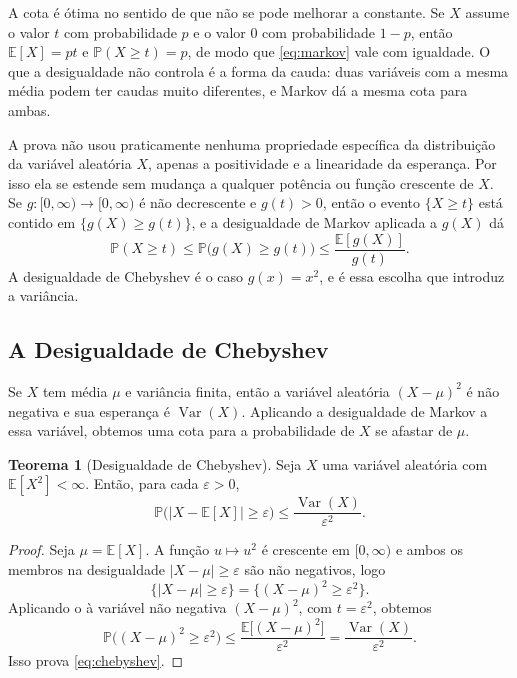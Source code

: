 \documentclass[12pt,portuguese]{article}
\theoremstyle{definition}
\newtheorem{theorem}{Teorema}
\theoremstyle{plainexercise}
\theoremstyle{starredexercise}
\theoremstyle{definition}
\begin{document}
A cota é ótima no sentido de que não se pode melhorar a constante. Se $X$
assume o valor $t$ com probabilidade $p$ e o valor $0$ com probabilidade
$1-p$, então $\mathbb{E}[X]=pt$ e $\mathbb{P}(X\geqslant t)=p$, de modo que
\eqref{eq:markov} vale com igualdade. O que a desigualdade não controla é a
forma da cauda: duas variáveis com a mesma média podem ter caudas muito
diferentes, e Markov dá a mesma cota para ambas.

A prova não usou praticamente nenhuma propriedade específica da distribuição da variável
aleatória $X$, apenas a positividade e a
linearidade da esperança. Por isso ela se estende sem mudança a qualquer
potência ou função crescente de $X$. Se $g\colon[0,\infty)\to[0,\infty)$ é não
decrescente e $g(t)>0$, então o evento $\{X\geqslant t\}$ está contido em
$\{g(X)\geqslant g(t)\}$, e a desigualdade de Markov aplicada a $g(X)$ dá
\begin{equation}\label{eq:markov-generalizada}
\mathbb{P}(X\geqslant t)
\leqslant
\mathbb{P}\bigl(g(X)\geqslant g(t)\bigr)
\leqslant
\frac{\mathbb{E}[g(X)]}{g(t)}.
\end{equation}
A desigualdade de Chebyshev é o caso $g(x)=x^2$, e é essa escolha que
introduz a variância.

\subsection{A Desigualdade de Chebyshev}\label{subsec:chebyshev}

Se $X$ tem média $\mu$ e variância finita, então a variável aleatória $(X-\mu)^2$ é não
negativa e sua esperança é $\operatorname{Var}(X)$. Aplicando a desigualdade de
Markov a essa variável, obtemos uma cota para a probabilidade de $X$ se
afastar de $\mu$.

\begin{theorem}[Desigualdade de Chebyshev]\label{thm:chebyshev}
Seja $X$ uma variável aleatória com $\mathbb{E}[X^2]<\infty$. Então, para cada
$\varepsilon>0$,
\begin{equation}\label{eq:chebyshev}
\mathbb{P}\bigl(|X-\mathbb{E}[X]|\geqslant\varepsilon\bigr)
\leqslant
\frac{\operatorname{Var}(X)}{\varepsilon^2}.
\end{equation}
\end{theorem}

\begin{proof}
Seja $\mu=\mathbb{E}[X]$. A função $u\longmapsto u^2$ é crescente em $[0,\infty)$
e ambos os membros na desigualdade $|X-\mu|\geqslant\varepsilon$ são não negativos, logo
\[
\{|X-\mu|\geqslant\varepsilon\}
=
\{(X-\mu)^2\geqslant\varepsilon^2\}.
\]
Aplicando o  à variável não negativa $(X-\mu)^2$, com $t=\varepsilon^2$, obtemos
\[
\mathbb{P}\bigl((X-\mu)^2\geqslant\varepsilon^2\bigr)
\leqslant
\frac{\mathbb{E}\bigl[(X-\mu)^2\bigr]}{\varepsilon^2}
=
\frac{\operatorname{Var}(X)}{\varepsilon^2}.
\]
Isso prova \eqref{eq:chebyshev}.
\end{proof}
\end{document}
